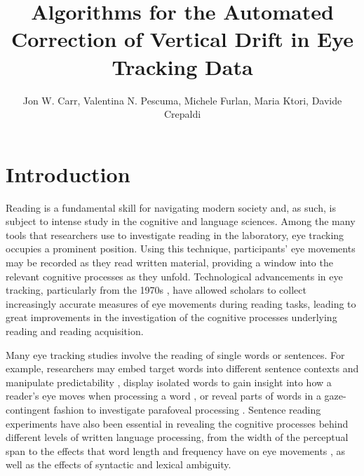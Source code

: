 \documentclass[doc,biblatex]{apa7}
\title{Algorithms for the Automated Correction of Vertical Drift in Eye Tracking Data}
\author{Jon W. Carr, Valentina N. Pescuma, Michele Furlan, Maria Ktori, Davide Crepaldi}
\affiliation{Cognitive Neuroscience, International School for Advanced Studies, Trieste, Italy}
\begin{document}
\maketitle

\section{Introduction}

Reading is a fundamental skill for navigating modern society and, as such, is subject to intense study in the cognitive and language sciences. Among the many tools that researchers use to investigate reading in the laboratory, eye tracking occupies a prominent position. Using this technique, participants' eye movements may be recorded as they read written material, providing a window into the relevant cognitive processes as they unfold. Technological advancements in eye tracking, particularly from the 1970s \parencite[see e.g.,][]{Rayner:1998}, have allowed scholars to collect increasingly accurate measures of eye movements during reading tasks, leading to great improvements in the investigation of the cognitive processes underlying reading and reading acquisition.

Many eye tracking studies involve the reading of single words or sentences. For example, researchers may embed target words into different sentence contexts and manipulate predictability \parencite[e.g.,][]{Rayner:2001}, display isolated words to gain insight into how a reader's eye moves when processing a word \parencite[e.g.,][]{Vitu:2004}, or reveal parts of words in a gaze-contingent fashion to investigate parafoveal processing \parencite[e.g.,][]{Schotter:2012}. Sentence reading experiments have also been essential in revealing the cognitive processes behind different levels of written language processing, from the width of the perceptual span \parencite[e.g.,][]{Rayner:1986,Blythe:2009} to the effects that word length and frequency have on eye movements \parencite[e.g.,][]{Joseph:2009,TiffinRichards:2015}, as well as the effects of syntactic \parencite[e.g.,][]{Frazier:1982,Pickering:1998} and lexical \parencite[e.g.,][]{Sereno:2006} ambiguity.
\end{document}
